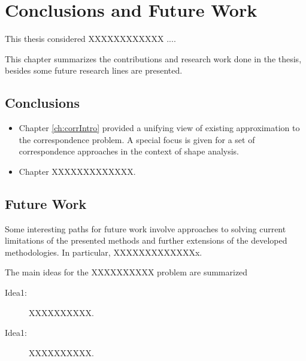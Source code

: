 

\chapter{Conclusions and Future Work}
\label{chr:Conclusions}


This thesis considered XXXXXXXXXXXX  ....

This chapter summarizes the contributions and research work done in the thesis, besides some future research lines are presented.

\section{Conclusions}

\begin{itemize}
	\item Chapter \ref{ch:corrIntro} provided a unifying view of existing approximation to the correspondence problem. A special focus
	is given for a set of correspondence approaches in the context of shape analysis.

\item Chapter XXXXXXXXXXXXX.
 
\end{itemize}


\section{Future Work}

Some interesting paths for future work involve approaches to solving current limitations of the presented methods and further extensions of the developed methodologies. In particular, XXXXXXXXXXXXXx.

The main ideas for the XXXXXXXXXX problem are summarized

\begin{description}
	\item[Idea1:] XXXXXXXXXX.
	
		\item[Idea1:] XXXXXXXXXX.
\end{description}





\outbpdocument{}